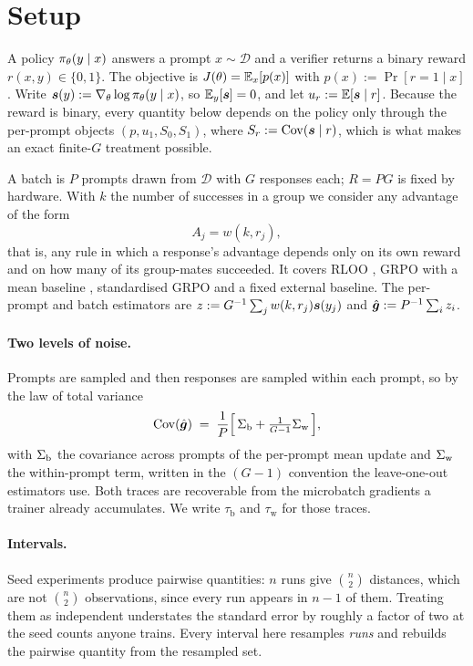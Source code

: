 \section{Setup}
\label{sec:setup}

A policy $\pi_{\theta}(y \mid x)$ answers a prompt $x \sim \mathcal{D}$ and a verifier returns a binary
reward $r(x,y) \in \{0,1\}$. The objective is $J(\theta) = \mathbb{E}_x[p(x)]$ with
$p(x) := \Pr[r = 1 \mid x]$. Write $\bm{s}(y) := \nabla_\theta \log \pi_{\theta}(y \mid x)$, so
$\mathbb{E}_y[\bm{s}] = 0$, and let $u_r := \mathbb{E}[\bm{s} \mid r]$. Because the reward is binary, every
quantity below depends on the policy only through the per-prompt objects $(p, u_1, S_0, S_1)$,
where $S_r := \operatorname{Cov}(\bm{s} \mid r)$, which is what makes an exact finite-$G$ treatment possible.

A batch is $P$ prompts drawn from $\mathcal{D}$ with $G$ responses each; $R = PG$ is fixed by
hardware. With $k$ the number of successes in a group we consider any advantage of the form
\begin{equation}
  \label{eq:family}
  A_j = w(k, r_j),
\end{equation}
that is, any rule in which a response's advantage depends only on its own reward and on how many of its group-mates succeeded. It covers RLOO \citep{ahmadian2024rloo}, GRPO with a mean baseline
\citep{liu2025drgrpo}, standardised GRPO \citep{shao2024deepseekmath} and a fixed external
baseline. The per-prompt and batch estimators are
$z := G^{-1}\sum_j w(k, r_j)\bm{s}(y_j)$ and $\hat{\bm{g}} := P^{-1}\sum_i z_i$.

\paragraph{Two levels of noise.} Prompts are sampled and then responses are sampled within each
prompt, so by the law of total variance
\begin{equation}
  \label{eq:two-level}
  \operatorname{Cov}(\hat{\bm{g}}) \;=\; \frac{1}{P}\Big[\, \Sigma_{\mathrm{b}} + \tfrac{1}{G-1}\Sigma_{\mathrm{w}} \,\Big],
\end{equation}
with $\Sigma_{\mathrm{b}}$ the covariance across prompts of the per-prompt mean update and $\Sigma_{\mathrm{w}}$ the within-prompt
term, written in the $(G-1)$ convention the leave-one-out estimators use. Both traces are
recoverable from the microbatch gradients a trainer already accumulates. We write
$\tau_{\mathrm{b}}$ and $\tau_{\mathrm{w}}$ for those traces.

\paragraph{Intervals.} Seed experiments produce pairwise quantities: $n$ runs give $\binom{n}{2}$
distances, which are not $\binom{n}{2}$ observations, since every run appears in $n-1$ of them.
Treating them as independent understates the standard error by roughly a factor of two at the seed
counts anyone trains. Every interval here resamples \emph{runs} and rebuilds the pairwise quantity
from the resampled set.
